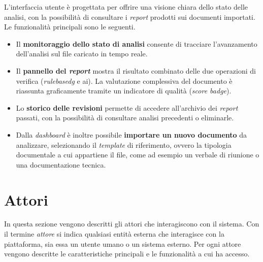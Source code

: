 L'interfaccia utente è progettata per offrire una visione chiara dello stato delle analisi, con la possibilità di consultare i \emph{report} prodotti sui documenti importati. Le funzionalità principali sono le seguenti.

\begin{itemize}
    \item Il \textbf{monitoraggio dello stato di analisi} consente di tracciare l'avanzamento dell'analisi sul file caricato in tempo reale.
    \item Il \textbf{pannello del \emph{report}} mostra il risultato combinato delle due operazioni di verifica (\emph{\gls{rulebasedg}} e ai). La valutazione complessiva del documento è riassunta graficamente tramite un indicatore di qualità (\emph{score badge}).
    \item Lo \textbf{storico delle revisioni} permette di accedere all'archivio dei \emph{report} passati, con la possibilità di consultare analisi precedenti o eliminarle.
    \item Dalla \emph{dashboard} è inoltre possibile \textbf{importare un nuovo documento} da analizzare, selezionando il \emph{template} di riferimento, ovvero la tipologia documentale a cui appartiene il file, come ad esempio un verbale di riunione o una documentazione tecnica.
\end{itemize}



\newpage
\section{Attori}

In questa sezione vengono descritti gli attori che interagiscono con il sistema. Con il termine \emph{attore} si indica qualsiasi entità esterna che interagisce con la piattaforma, sia essa un utente umano o un sistema esterno. Per ogni attore vengono descritte le caratteristiche principali e le funzionalità a cui ha accesso.

